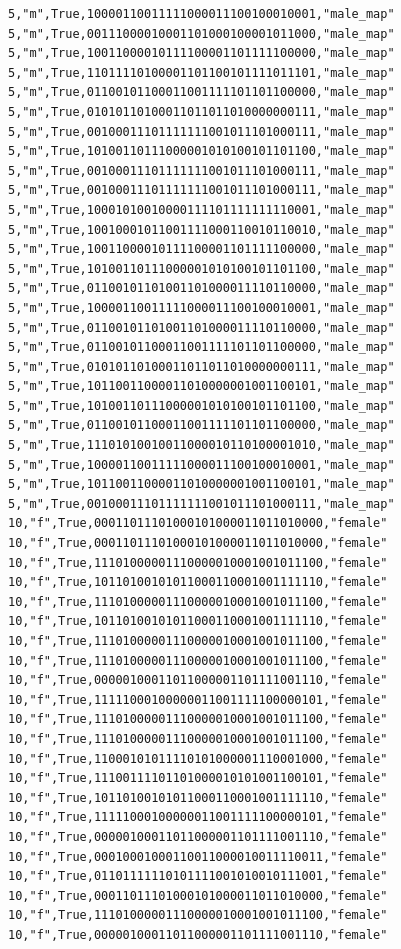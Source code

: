 \documentclass[authoryearcitations]{UoYCSproject}
\begin{document}
\begin{framed}
\begin{verbatim}
5,"m",True,10000110011111000011100100010001,"male_map"
5,"m",True,00111000010001101000100001011000,"male_map"
5,"m",True,10011000010111100001101111100000,"male_map"
5,"m",True,11011110100001101100101111011101,"male_map"
5,"m",True,01100101100011001111101101100000,"male_map"
5,"m",True,01010110100011011011010000000111,"male_map"
5,"m",True,00100011101111111001011101000111,"male_map"
5,"m",True,10100110111000001010100101101100,"male_map"
5,"m",True,00100011101111111001011101000111,"male_map"
5,"m",True,00100011101111111001011101000111,"male_map"
5,"m",True,10001010010000111101111111110001,"male_map"
5,"m",True,10010001011001111000110010110010,"male_map"
5,"m",True,10011000010111100001101111100000,"male_map"
5,"m",True,10100110111000001010100101101100,"male_map"
5,"m",True,01100101101001101000011110110000,"male_map"
5,"m",True,10000110011111000011100100010001,"male_map"
5,"m",True,01100101101001101000011110110000,"male_map"
5,"m",True,01100101100011001111101101100000,"male_map"
5,"m",True,01010110100011011011010000000111,"male_map"
5,"m",True,10110011000011010000001001100101,"male_map"
5,"m",True,10100110111000001010100101101100,"male_map"
5,"m",True,01100101100011001111101101100000,"male_map"
5,"m",True,11101010010011000010110100001010,"male_map"
5,"m",True,10000110011111000011100100010001,"male_map"
5,"m",True,10110011000011010000001001100101,"male_map"
5,"m",True,00100011101111111001011101000111,"male_map"
10,"f",True,00011011101000101000011011010000,"female"
10,"f",True,00011011101000101000011011010000,"female"
10,"f",True,11101000001110000010001001011100,"female"
10,"f",True,10110100101011000110001001111110,"female"
10,"f",True,11101000001110000010001001011100,"female"
10,"f",True,10110100101011000110001001111110,"female"
10,"f",True,11101000001110000010001001011100,"female"
10,"f",True,11101000001110000010001001011100,"female"
10,"f",True,00000100011011000001101111001110,"female"
10,"f",True,11111000100000011001111100000101,"female"
10,"f",True,11101000001110000010001001011100,"female"
10,"f",True,11101000001110000010001001011100,"female"
10,"f",True,11000101011110101000001110001000,"female"
10,"f",True,11100111101101000010101001100101,"female"
10,"f",True,10110100101011000110001001111110,"female"
10,"f",True,11111000100000011001111100000101,"female"
10,"f",True,00000100011011000001101111001110,"female"
10,"f",True,00010001000110011000010011110011,"female"
10,"f",True,01101111110101111001010010111001,"female"
10,"f",True,00011011101000101000011011010000,"female"
10,"f",True,11101000001110000010001001011100,"female"
10,"f",True,00000100011011000001101111001110,"female"

\end{verbatim}
\end{framed}
\end{document}
